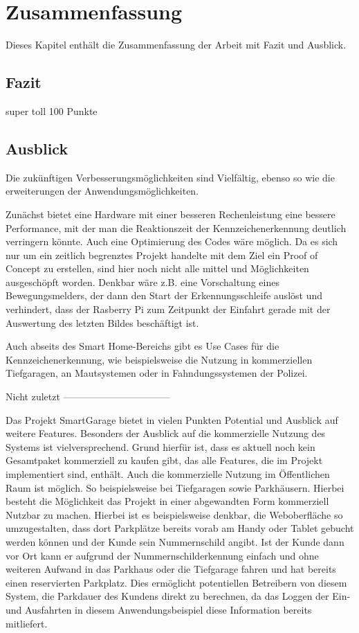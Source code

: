 \chapter{Zusammenfassung}

\nocite{*}

Dieses Kapitel enthält die Zusammenfassung der Arbeit mit Fazit und Ausblick.

\section{Fazit}

super toll 100 Punkte

\section{Ausblick}

Die zukünftigen Verbesserungsmöglichkeiten sind Vielfältig, ebenso so wie die erweiterungen der Anwendungsmöglichkeiten.

Zunächst bietet eine Hardware mit einer besseren Rechenleistung eine bessere Performance, mit der man die Reaktionszeit der Kennzeichenerkennung deutlich verringern könnte. Auch eine Optimierung des Codes wäre möglich. Da es sich nur um ein zeitlich begrenztes Projekt handelte mit dem Ziel ein Proof of Concept zu erstellen, sind hier noch nicht alle mittel und Möglichkeiten ausgeschöpft worden. Denkbar wäre z.B. eine Vorschaltung eines Bewegungsmelders, der dann den Start der Erkennungsschleife auslöst und verhindert, dass der Rasberry Pi zum Zeitpunkt der Einfahrt gerade mit der Auswertung des letzten Bildes beschäftigt ist.

Auch abseits des Smart Home-Bereichs gibt es Use Cases für die Kennzeichenerkennung, wie beispielsweise die Nutzung in kommerziellen Tiefgaragen, an Mautsystemen oder in Fahndungssystemen der Polizei.

Nicht zuletzt 
---------------------------------

Das Projekt SmartGarage bietet in vielen Punkten Potential und Ausblick auf weitere Features. Besonders der Ausblick auf die kommerzielle Nutzung des Systems ist vielversprechend. Grund hierfür ist, dass es aktuell noch kein Gesamtpaket kommerziell zu kaufen gibt, das alle Features, die im Projekt implementiert sind, enthält. Auch die kommerzielle Nutzung im Öffentlichen Raum ist möglich. So beispielsweise bei Tiefgaragen sowie Parkhäusern. Hierbei besteht die Möglichkeit das Projekt in einer abgewandten Form kommerziell Nutzbar zu machen. Hierbei ist es beispielsweise denkbar, die Weboberfläche so umzugestalten, dass dort Parkplätze bereits vorab am Handy oder Tablet gebucht werden können und der Kunde sein Nummernschild angibt. Ist der Kunde dann vor Ort kann er aufgrund der Nummernschilderkennung einfach und ohne weiteren Aufwand in das Parkhaus oder die Tiefgarage fahren und hat bereits einen reservierten Parkplatz. Dies ermöglicht potentiellen Betreibern von diesem System, die Parkdauer des Kundens direkt zu berechnen, da das Loggen der Ein- und Ausfahrten in diesem Anwendungsbeispiel diese Information bereits mitliefert. 

